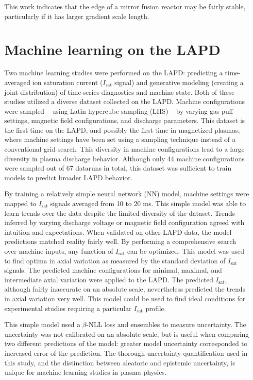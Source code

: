 This work indicates that the edge of a mirror fusion reactor may be fairly stable, particularly if it has larger gradient scale length.

\section{Machine learning on the LAPD}

Two machine learning studies were performed on the LAPD: predicting a time-averaged ion saturation current ($I_\text{sat}$ signal) and generative modeling (creating a joint distribution) of time-series diagnostics and machine state. Both of these studies utilized a diverse dataset collected on the LAPD. Machine configurations were sampled -- using Latin hypercube sampling (LHS) -- by varying gas puff settings, magnetic field configurations, and discharge parameters. This dataset is the first time on the LAPD, and possibly the first time in magnetized plasmas, where machine settings have been set using a sampling technique instead of a conventional grid search. This diversity in machine configurations lead to a large diversity in plasma discharge behavior. Although only 44 machine configurations were sampled out of 67 dataruns in total, this dataset was sufficient to train models to predict broader LAPD behavior.

By training a relatively simple neural network (NN) model, machine settings were mapped to $I_\text{sat}$ signals averaged from 10 to 20 ms. This simple model was able to learn trends over the data despite the limited diversity of the dataset. Trends inferred by varying discharge voltage or magnetic field configuration agreed with intuition and expectations. When validated on other LAPD data, the model predictions matched reality fairly well. By performing a comprehensive search over machine inputs, any function of $I_\text{sat}$ can be optimized. This model was used to find optima in axial variation as measured by the standard deviation of $I_\text{sat}$ signals. The predicted machine configurations for minimal, maximal, and intermediate axial variation were applied to the LAPD. The predicted $I_\text{sat}$, although fairly inaccurate on an absolute scale, nevertheless predicted the trends in axial variation very well. This model could be used to find ideal conditions for experimental studies requiring a particular $I_\text{sat}$ profile. 

This simple model used a $\beta$-NLL loss and ensembles to measure uncertainty. The uncertainty was not calibrated on an absolute scale, but is useful when comparing two different predictions of the model: greater model uncertainty corresponded to increased error of the prediction. The thorough uncertainty quantification used in this study, and the distinction between aleatoric and epistemic uncertainty, is unique for machine learning studies in plasma physics. 

